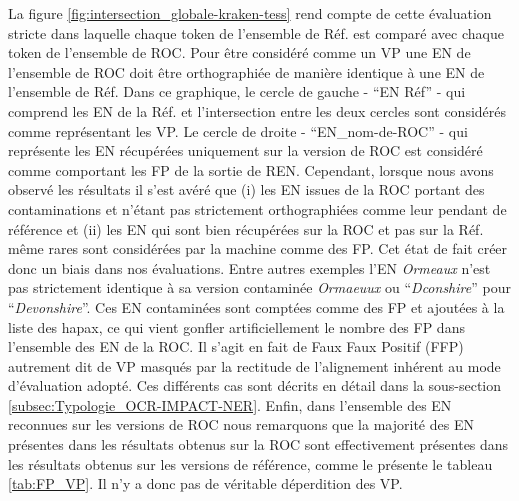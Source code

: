 La figure \ref{fig:intersection_globale-kraken-tess} rend compte de cette évaluation stricte dans laquelle chaque token de l'ensemble de Réf. est comparé avec chaque token de l'ensemble de ROC. Pour être considéré comme un VP une EN de l'ensemble de ROC doit être orthographiée de manière identique à une EN de l'ensemble de Réf. Dans ce graphique, le cercle de gauche - ``EN Réf'' - qui comprend les EN de la Réf. et l'intersection entre les deux cercles sont considérés comme représentant les VP. Le cercle de droite - ``EN\_nom-de-ROC'' - qui représente les EN récupérées uniquement sur la version de ROC est considéré comme comportant les FP de la sortie de REN. Cependant, lorsque nous avons observé les résultats il s'est avéré que (i) les EN issues de la ROC portant des contaminations et n'étant pas strictement orthographiées comme leur pendant de référence et (ii) les EN qui sont bien récupérées sur la ROC et pas sur la Réf. même rares sont considérées par la machine comme des FP. Cet état de fait créer donc un biais dans nos évaluations. Entre autres exemples l'EN \textit{Ormeaux} n'est pas strictement identique à sa version contaminée \textit{Ormaeuux} ou ``\textit{Dconshire}'' pour ``\textit{Devonshire}''. Ces EN contaminées sont comptées comme des FP et ajoutées à la liste des hapax, ce qui vient gonfler artificiellement le nombre des FP dans l'ensemble des EN de la ROC. Il s'agit en fait de Faux Faux Positif (FFP) autrement dit de VP masqués par la rectitude de l'alignement inhérent au mode d'évaluation adopté. Ces différents cas sont décrits en détail dans la sous-section \ref{subsec:Typologie_OCR-IMPACT-NER}.
 Enfin, dans l'ensemble des EN reconnues sur les versions de ROC nous remarquons que la majorité des EN présentes dans les résultats obtenus sur la ROC sont effectivement présentes dans les résultats obtenus sur les versions de référence, comme le présente le tableau \ref{tab:FP_VP}. Il n'y a donc pas de véritable déperdition des VP. 










